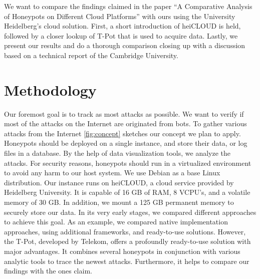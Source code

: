 We want to compare the findings \citet{Kelly2021} claimed in the paper \enquote{A Comparative Analysis of Honeypots on Different Cloud Platforms} with ours using the University Heidelberg's cloud solution.
First, a short introduction of heiCLOUD is held, followed by a closer lookup of T-Pot that is used to acquire data.
Lastly, we present our results and do a thorough comparison closing up with a discussion based on a technical report of the Cambridge University.

\section{Methodology}

Our foremost goal is to track as most attacks as possible.
We want to verify if most of the attacks on the Internet are originated from bots.
To gather various attacks from the Internet \autoref{fig:concept} sketches our concept we plan to apply.
Honeypots should be deployed on a single instance, and store their data, or log files in a database.
By the help of data visualization tools, we analyze the attacks.
For security reasons, honeypots should run in a virtualized environment to avoid any harm to our host system.
We use Debian as a base Linux distribution.
Our instance runs on heiCLOUD, a cloud service provided by Heidelberg University.
It is capable of 16 GB of RAM, 8 VCPU's, and a volatile memory of 30 GB.
In addition, we mount a 125 GB permanent memory to securely store our data.
In its very early stages, we compared different approaches to achieve this goal.
As an example, we compared native implementation approaches, using additional frameworks, and ready-to-use solutions.
However, the T-Pot, developed by Telekom, offers a profoundly ready-to-use solution with major advantages.
It combines several honeypots in conjunction with various analytic tools to trace the newest attacks.
Furthermore, it helps to compare our findings with the ones \citet{Kelly2021} claim.

